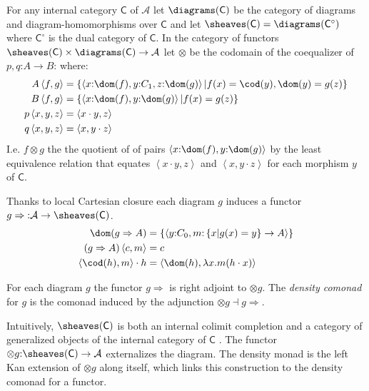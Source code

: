 \documentclass{tac}
\newcommand\hide[1]{}
\newcommand\cat\mathcal
\newcommand\icat\mathsf
\newcommand\of{\mathord:}
\newcommand\set[1]{\left\{#1\right\}}
\newcommand\dual{^\circ}
\newcommand\tuplet[1]{\left\langle #1 \right\rangle}
\begin{document}
\begin{definition}
For any internal category $\icat C$ of $\cat A$ 
let $\diagrams(\icat C)$ be the category of diagrams and diagram-homomorphisms over $\icat C$ and let $\sheaves(\icat C) = \diagrams(\icat C\dual)$ where $\icat C\dual$ is the dual category of $\icat C$. In the category of functors $\sheaves(\icat C)\times\diagrams(\icat C) \to\cat A$ let $\otimes$ be the codomain of the coequalizer of 
$p,q\of A\to B \of $ where:
\begin{align*}
A\tuplet{f,g} &= \set{\tuplet{x\of \dom(f),y\of C_1,z\of\dom(g)}|f(x) = \cod(y), \dom(y) = g(z)}\\
B\tuplet{f,g} &= \set{\tuplet{x\of \dom(f),y\of\dom(g)}|f(x) = g(z)}\\
p\tuplet{x,y,z}&=\tuplet{x\cdot y,z}\\
q\tuplet{x,y,z}&=\tuplet{x,y\cdot z}
\end{align*}
I.e. $f\otimes g$ the the quotient of of pairs $\tuplet{x\of\dom(f),y\of\dom(g)}$ by the least equivalence relation that equates $\tuplet{x\cdot y,z}$ and $\tuplet{x, y\cdot z}$ for each morphism $y$ of $\icat C$.

Thanks to local Cartesian closure each diagram $g$ induces a functor $g\Rightarrow  \of \cat A\to \sheaves(\icat C)$.
\begin{align*}
\dom(g\Rightarrow A) &= \set{\tuplet{y\of C_0,m\of\set{x | g(x) = y}\to A}}\\
(g\Rightarrow A)\tuplet{c,m} &= c\\
 \tuplet{\cod(h),m}\cdot h &= \tuplet{\dom(h),\lambda x.m(h\cdot x)}
\end{align*}

For each diagram $g$ the functor $g\Rightarrow$ is right adjoint to $\otimes g$. 
The \emph{density comonad} for $g$ is the comonad induced by the adjunction $\otimes g\dashv g\Rightarrow$.
\end{definition}

Intuitively, $\sheaves(\icat C)$ is both an internal colimit completion and a category of generalized objects of the internal category of $\icat C$ . The functor $\otimes g\of \sheaves(\icat C) \to \cat A$ externalizes the diagram. The density monad is the left Kan extension of $\otimes g$ along itself, which links this construction to the density comonad for a functor.

\hide{
we will need to revisit the concepts and notions throughout this document

some guidelines:
- the greater the scope, the more descriptive the identifier
- keep refactoring
- define small generic components and compose them 
}
\end{document}
